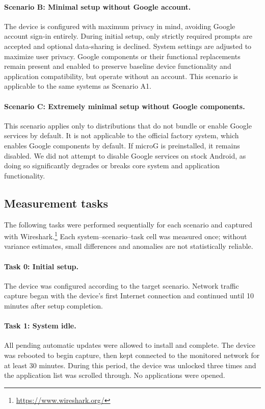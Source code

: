\documentclass[runningheads]{llncs}
\begin{document}
\paragraph{Scenario B: Minimal setup without Google account.}
The device is configured with maximum privacy in mind, avoiding Google account sign-in entirely. During initial setup, only strictly required prompts are accepted and optional data-sharing is declined. System settings are adjusted to maximize user privacy. Google components or their functional replacements remain present and enabled to preserve baseline device functionality and application compatibility, but operate without an account. This scenario is applicable to the same systems as Scenario A1.

\paragraph{Scenario C: Extremely minimal setup without Google components.}
This scenario applies only to distributions that do not bundle or enable Google services by default. It is not applicable to the official factory system, which enables Google components by default. If microG is preinstalled, it remains disabled. We did not attempt to disable Google services on stock Android, as doing so significantly degrades or breaks core system and application functionality.

\subsection{Measurement tasks}
The following tasks were performed sequentially for each scenario and captured with Wireshark.\footnote{\url{https://www.wireshark.org/}} Each system--scenario--task cell was measured once; without variance estimates, small differences and anomalies are not statistically reliable.

\paragraph{Task 0: Initial setup.}
The device was configured according to the target scenario. Network traffic capture began with the device's first Internet connection and continued until 10 minutes after setup completion.

\paragraph{Task 1: System idle.}
All pending automatic updates were allowed to install and complete. The device was rebooted to begin capture, then kept connected to the monitored network for at least 30 minutes. During this period, the device was unlocked three times and the application list was scrolled through. No applications were opened.
\end{document}
